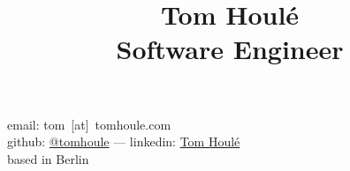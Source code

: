 \documentclass[10pt]{article}
\date{}
\title{Tom Houlé \\ Software Engineer}
\author{}
\begin{document}

\selectfont

\maketitle

\vspace{-14mm}

\begin{center}
email: tom~[at]~tomhoule.com \\
github: \href{https://github.com/tomhoule}{@tomhoule}  --- linkedin: \href{https://www.linkedin.com/in/tom-houl\%C3\%A9-4398135a/}{Tom Houlé} \\
based in Berlin
\end{center}

\vspace{10mm}
\end{document}
